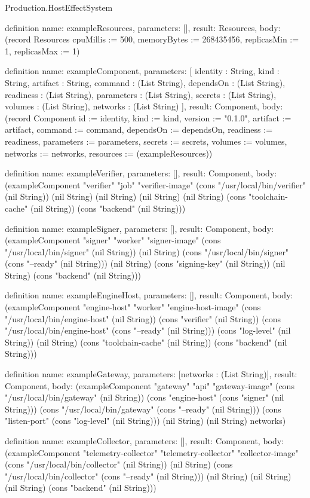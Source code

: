 \begin{lexlean}{Production.HostEffectSystem}
\begin{semanticmodule}
definition{
  name: exampleResources,
  parameters: [],
  result: Resources,
  body: (record Resources {cpuMillis := 500, memoryBytes := 268435456, replicasMin := 1, replicasMax := 1})
}

definition{
  name: exampleComponent,
  parameters: [
    identity : String,
    kind : String,
    artifact : String,
    command : (List String),
    dependsOn : (List String),
    readiness : (List String),
    parameters : (List String),
    secrets : (List String),
    volumes : (List String),
    networks : (List String)
  ],
  result: Component,
  body: (record Component {id := identity, kind := kind, version := "0.1.0", artifact := artifact, command := command, dependsOn := dependsOn, readiness := readiness, parameters := parameters, secrets := secrets, volumes := volumes, networks := networks, resources := (exampleResources)})
}

definition{
  name: exampleVerifier,
  parameters: [],
  result: Component,
  body: (exampleComponent "verifier" "job" "verifier-image" (cons "/usr/local/bin/verifier" (nil String)) (nil String) (nil String) (nil String) (nil String) (cons "toolchain-cache" (nil String)) (cons "backend" (nil String)))
}

definition{
  name: exampleSigner,
  parameters: [],
  result: Component,
  body: (exampleComponent "signer" "worker" "signer-image" (cons "/usr/local/bin/signer" (nil String)) (nil String) (cons "/usr/local/bin/signer" (cons "--ready" (nil String))) (nil String) (cons "signing-key" (nil String)) (nil String) (cons "backend" (nil String)))
}

definition{
  name: exampleEngineHost,
  parameters: [],
  result: Component,
  body: (exampleComponent "engine-host" "worker" "engine-host-image" (cons "/usr/local/bin/engine-host" (nil String)) (cons "verifier" (nil String)) (cons "/usr/local/bin/engine-host" (cons "--ready" (nil String))) (cons "log-level" (nil String)) (nil String) (cons "toolchain-cache" (nil String)) (cons "backend" (nil String)))
}

definition{
  name: exampleGateway,
  parameters: [networks : (List String)],
  result: Component,
  body: (exampleComponent "gateway" "api" "gateway-image" (cons "/usr/local/bin/gateway" (nil String)) (cons "engine-host" (cons "signer" (nil String))) (cons "/usr/local/bin/gateway" (cons "--ready" (nil String))) (cons "listen-port" (cons "log-level" (nil String))) (nil String) (nil String) networks)
}

definition{
  name: exampleCollector,
  parameters: [],
  result: Component,
  body: (exampleComponent "telemetry-collector" "telemetry-collector" "collector-image" (cons "/usr/local/bin/collector" (nil String)) (nil String) (cons "/usr/local/bin/collector" (cons "--ready" (nil String))) (nil String) (nil String) (nil String) (cons "backend" (nil String)))
}


\end{semanticmodule}
\end{lexlean}
